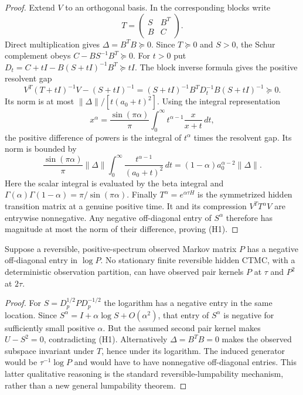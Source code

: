 \begin{proof}
Extend $V$ to an orthogonal basis. In the corresponding blocks write
\[
 T=\begin{pmatrix}S&B^T\\B&C\end{pmatrix}.
\]
Direct multiplication gives $\Delta=B^TB\succeq0$. Since $T\succeq0$
and $S>0$, the Schur complement obeys $C-BS^{-1}B^T\succeq0$.
For $t>0$ put $D_t=C+tI-B(S+tI)^{-1}B^T\succeq tI$. The block
inverse formula gives the positive resolvent gap
\[
 V^T(T+tI)^{-1}V-(S+tI)^{-1}
 =(S+tI)^{-1}B^TD_t^{-1}B(S+tI)^{-1}\succeq0.
\]
Its norm is at most $\|\Delta\|/[t(a_0+t)^2]$.
Using the integral representation
\[
 x^\alpha=\frac{\sin(\pi\alpha)}{\pi}
 \int_0^\infty t^{\alpha-1}\frac{x}{x+t}\,dt,
\]
the positive difference of powers is the integral of $t^\alpha$ times
the resolvent gap. Its norm is bounded by
\[
 \frac{\sin(\pi\alpha)}{\pi}\|\Delta\|
 \int_0^\infty\frac{t^{\alpha-1}}{(a_0+t)^2}\,dt
 =(1-\alpha)a_0^{\alpha-2}\|\Delta\|.
\]
Here the scalar integral is evaluated by the beta integral and
$\Gamma(\alpha)\Gamma(1-\alpha)=\pi/\sin(\pi\alpha)$.
Finally $T^\alpha=e^{\alpha\tau H}$ is the symmetrized hidden transition
matrix at a genuine positive time. It and its compression $V^TT^\alpha V$
are entrywise nonnegative. Any negative off-diagonal entry of $S^\alpha$
therefore has magnitude at most the norm of their difference, proving (H1).
\end{proof}

\begin{corollary}
Suppose a reversible, positive-spectrum observed Markov matrix $P$ has a
negative off-diagonal entry in $\log P$. No stationary finite reversible
hidden CTMC, with a deterministic observation partition, can have observed
pair kernels $P$ at $\tau$ and $P^2$ at $2\tau$.
\end{corollary}

\begin{proof}
For $S=D_p^{1/2}PD_p^{-1/2}$ the logarithm has a negative entry in the
same location. Since $S^\alpha=I+\alpha\log S+O(\alpha^2)$, that entry
of $S^\alpha$ is negative for sufficiently small positive $\alpha$.
But the assumed second pair kernel makes $U-S^2=0$, contradicting (H1).
Alternatively $\Delta=B^TB=0$ makes the observed subspace invariant under
$T$, hence under its logarithm. The induced generator would be
$\tau^{-1}\log P$ and would have to have nonnegative off-diagonal entries.
This latter qualitative reasoning is the standard reversible-lumpability
mechanism, rather than a new general lumpability theorem.
\end{proof}

